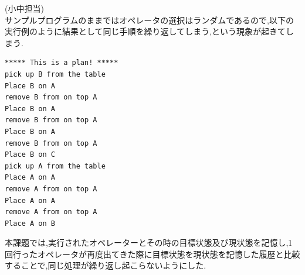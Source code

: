 \documentclass[uplatex,12pt]{jsarticle}
\begin{document}
\noindent (小中担当) \\
サンプルプログラムのままではオペレータの選択はランダムであるので,以下の実行例のように結果として同じ手順を繰り返してしまう,という現象が起きてしまう.
\begin{lstlisting}[caption=繰り返しの実行例, label=mid]
***** This is a plan! *****
pick up B from the table
Place B on A
remove B from on top A
Place B on A
remove B from on top A
Place B on A
remove B from on top A
Place B on C
pick up A from the table
Place A on A
remove A from on top A
Place A on A
remove A from on top A
Place A on B
\end{lstlisting}
本課題では,実行されたオペレーターとその時の目標状態及び現状態を記憶し,1回行ったオペレータが再度出てきた際に目標状態を現状態を記憶した履歴と比較することで,同じ処理が繰り返し起こらないようにした.
\end{document}
